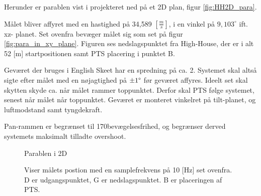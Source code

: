 Herunder er parablen vist i projekteret ned på et 
2D plan, figur \ref{fig:HH2D_para}.

Målet bliver affyret med en hastighed på 34,589 \([\frac{m}{s}]\), i en vinkel på \(9,103^{\circ}\) ift. xz-
planet. Set ovenfra bevæger målet sig som set på figur \ref{fig:para_in_xy_plane}. 
Figuren ses nedslagspunktet fra High-House, der er i alt 52 [m] startpositionen samt 
PTS placering i punktet B. 

Geværet der bruges i English Skeet har en spredning på ca. 2\degree . Systemet skal altså sigte efter målet med en nøjagtighed på $\pm 1 \degree$ før geværet affyres.
Ideelt set skal skytten skyde ca. når målet rammer toppunktet. 
Derfor skal PTS følge systemet, senest når målet når toppunktet. 
Geværet er monteret vinkelret på tilt-planet, og luftmodstand samt tyngdekraft.

Pan-rammen er begrænset til 170\degree   bevægelsesfrihed, og begrænser derved systemets maksimalt tilladte overshoot.
%
%




\begin{figure}[h!]
\centering
%
\caption[Målets parabel i 2 dimensioner]{Parablen i 2D}
\end{figure}



\begin{figure}[!th]
\centering
\begin{tikzpicture}[scale=2]

\end{tikzpicture}
\caption[tekst i indholdsfortegnelsen]{Viser målets postion med en samplefrekvens på 10 [Hz] set ovenfra. D er udgangspunktet, G er nedslagspunktet. B er placeringen af PTS.}
\label{fig:para_in_xyz_plane}
\end{figure}



